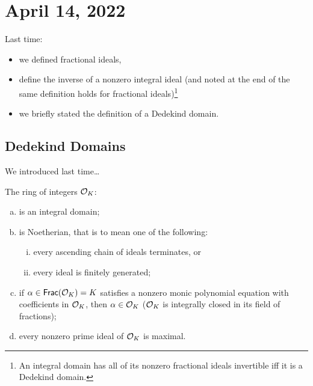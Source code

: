 \section{April 14, 2022}
\recall Last time:
\begin{itemize}
    \item we defined fractional ideals,
    \item define the inverse of a nonzero integral ideal (and noted at the end of the same definition holds for fractional ideals)\footnote{An integral domain has all of its nonzero fractional ideals invertible iff it is a Dedekind domain.}
    \item we briefly stated the definition of a Dedekind domain.
\end{itemize}
\subsection{Dedekind Domains}
We introduced last time\dots
\begin{theorem*}
    The ring of integers $\mathcal{O}_K$:
    \begin{enumerate}[(a)]
        \item is an integral domain;
        \item is Noetherian, that is to mean one of the following:
              \begin{enumerate}[(i)]
                  \item every ascending chain of ideals terminates, or
                  \item every ideal is finitely generated;
              \end{enumerate}
        \item if $\alpha\in\mathsf{Frac}(\mathcal{O}_K)=K$ satisfies a nonzero monic polynomial equation with coefficients in $\mathcal{O}_K$, then $\alpha\in\mathcal{O}_K$ ($\mathcal{O}_K$ is integrally closed in its field of fractions);
        \item every nonzero prime ideal of $\mathcal{O}_K$ is maximal.
    \end{enumerate}
\end{theorem*}
